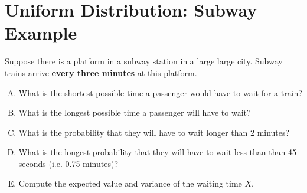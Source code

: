 \documentclass[a4paper,12pt]{article}
\begin{document}
\section*{Uniform Distribution: Subway Example}
Suppose there is a platform in a subway station in a large large city.  Subway trains arrive \textbf{every three minutes} at this platform.
\begin{enumerate}[(A)]
\item   What is the shortest possible time a passenger would have to wait for a train?
\item What is the longest possible time a passenger will have to wait?
\item What is the probability that they will have to wait longer than 2 minutes?
\item What is the longest probability that they will have to wait less than than 45 seconds (i.e. 0.75 minutes)?
\item Compute the expected value and variance of the waiting time $X$.
\end{enumerate}
\end{document}
